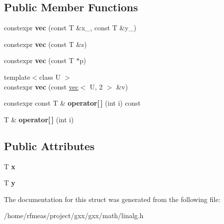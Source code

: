 \subsection*{Public Member Functions}
\begin{DoxyCompactItemize}
\item 
constexpr {\bfseries vec} (const T \&x\+\_\+, const T \&y\+\_\+)\hypertarget{structlinalg_1_1vec_3_01T_00_012_01_4_afc77c05c12561a24238f5efd47b0f9a1}{}\label{structlinalg_1_1vec_3_01T_00_012_01_4_afc77c05c12561a24238f5efd47b0f9a1}

\item 
constexpr {\bfseries vec} (const T \&s)\hypertarget{structlinalg_1_1vec_3_01T_00_012_01_4_ac565acdbde274b5456b157b07f1f90bd}{}\label{structlinalg_1_1vec_3_01T_00_012_01_4_ac565acdbde274b5456b157b07f1f90bd}

\item 
constexpr {\bfseries vec} (const T $\ast$p)\hypertarget{structlinalg_1_1vec_3_01T_00_012_01_4_a4704fbe1fda481d91d0c09d94a74e0c4}{}\label{structlinalg_1_1vec_3_01T_00_012_01_4_a4704fbe1fda481d91d0c09d94a74e0c4}

\item 
{\footnotesize template$<$class U $>$ }\\constexpr {\bfseries vec} (const \hyperlink{structlinalg_1_1vec}{vec}$<$ U, 2 $>$ \&v)\hypertarget{structlinalg_1_1vec_3_01T_00_012_01_4_aaf93006f7abc48c0a463ae7026c91664}{}\label{structlinalg_1_1vec_3_01T_00_012_01_4_aaf93006f7abc48c0a463ae7026c91664}

\item 
constexpr const T \& {\bfseries operator\mbox{[}$\,$\mbox{]}} (int i) const \hypertarget{structlinalg_1_1vec_3_01T_00_012_01_4_a8376cce5cd1a28d070a478685bad693e}{}\label{structlinalg_1_1vec_3_01T_00_012_01_4_a8376cce5cd1a28d070a478685bad693e}

\item 
T \& {\bfseries operator\mbox{[}$\,$\mbox{]}} (int i)\hypertarget{structlinalg_1_1vec_3_01T_00_012_01_4_a6a2959f645d7672cab804974cebcf996}{}\label{structlinalg_1_1vec_3_01T_00_012_01_4_a6a2959f645d7672cab804974cebcf996}

\end{DoxyCompactItemize}
\subsection*{Public Attributes}
\begin{DoxyCompactItemize}
\item 
T {\bfseries x}\hypertarget{structlinalg_1_1vec_3_01T_00_012_01_4_a430a33c183fcf2f10a09505133514874}{}\label{structlinalg_1_1vec_3_01T_00_012_01_4_a430a33c183fcf2f10a09505133514874}

\item 
T {\bfseries y}\hypertarget{structlinalg_1_1vec_3_01T_00_012_01_4_aa87aeae42dc7cfbc4a9c6683b7d19f6a}{}\label{structlinalg_1_1vec_3_01T_00_012_01_4_aa87aeae42dc7cfbc4a9c6683b7d19f6a}

\end{DoxyCompactItemize}


The documentation for this struct was generated from the following file\+:\begin{DoxyCompactItemize}
\item 
/home/rfmeas/project/gxx/gxx/math/linalg.\+h\end{DoxyCompactItemize}
